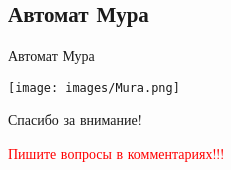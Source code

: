 \documentclass{beamer}
\begin{document}
\subsection{Автомат Мура}
\begin{frame}{Автомат Мура}
    \begin{center}
        \texttt{[image: images/Mura.png]}
    \end{center}
\end{frame}

\begin{frame}{}
    \centering
    \Large Спасибо за внимание!
    
    \vspace{1cm}
    \small \textcolor{red}{Пишите вопросы в комментариях!!!}
\end{frame}
\end{document}

